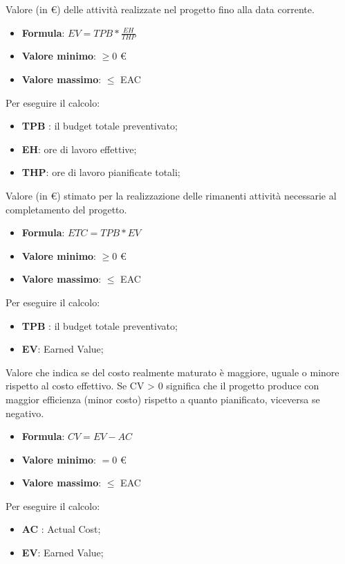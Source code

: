 Valore (in \euro) delle attività realizzate nel progetto fino alla data corrente. 
\begin{itemize}
    \item \textbf{Formula}: $EV=TPB*\frac{EH}{THP}$
    \item \textbf{Valore minimo}: $\geq0$ \euro
    \item \textbf{Valore massimo}: $\leq$ EAC
\end{itemize}  
Per eseguire il calcolo:
\begin{itemize}
    \item \textbf{TPB} : il budget totale preventivato;
    \item \textbf{EH}: ore di lavoro effettive;
    \item \textbf{THP}: ore di lavoro pianificate totali;
\end{itemize}

Valore (in \euro) stimato per la realizzazione delle rimanenti attività necessarie al completamento del progetto. 
\begin{itemize}
    \item \textbf{Formula}: $ETC=TPB*EV$
    \item \textbf{Valore minimo}: $\geq0$ \euro
    \item \textbf{Valore massimo}: $\leq$ EAC
\end{itemize}  
Per eseguire il calcolo:
\begin{itemize}
    \item \textbf{TPB} : il budget totale preventivato;
    \item \textbf{EV}: Earned Value;
\end{itemize}

Valore che indica se del costo realmente maturato è maggiore, uguale o minore rispetto al costo effettivo.
Se CV > 0 significa che il progetto produce con maggior efficienza (minor costo) rispetto a quanto pianificato, viceversa se negativo. 
\begin{itemize}
    \item \textbf{Formula}: $CV=EV-AC$
    \item \textbf{Valore minimo}: $=0$ \euro
    \item \textbf{Valore massimo}: $\leq$ EAC
\end{itemize}  
Per eseguire il calcolo:
\begin{itemize}
    \item \textbf{AC} : Actual Cost;
    \item \textbf{EV}: Earned Value;
\end{itemize}

